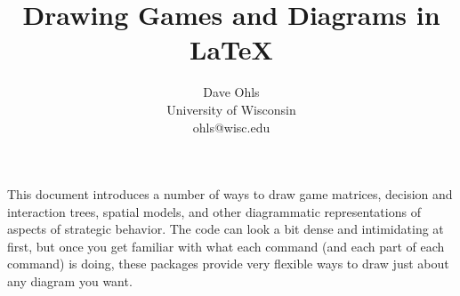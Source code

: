 \documentclass[10.5pt]{article}
\title{Drawing Games and Diagrams in \LaTeX}
\author{Dave Ohls \\ University of Wisconsin \\ ohls@wisc.edu}
\date{}
\begin{document}
\maketitle

This document introduces a number of ways to draw game matrices, decision and interaction trees, spatial models, and other diagrammatic representations of aspects of strategic behavior.  The code can look a bit dense and intimidating at first, but once you get familiar with what each command (and each part of each command) is doing, these packages provide very flexible ways to draw just about any diagram you want.   \\
\end{document}
